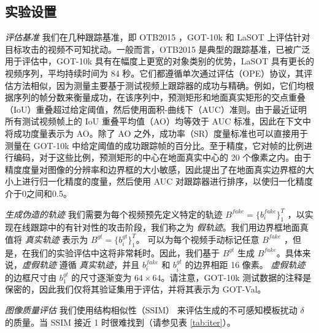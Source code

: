 \subsection{实验设置}

\textit{评估基准} 我们在几种跟踪基准，即 OTB2015 \cite{OTB}，GOT-10k \cite{GOT-10k} 和 LaSOT \cite{LaSOT} 上评估针对目标攻击的视频不可知扰动。一般而言，OTB2015 是典型的跟踪基准，已被广泛用于评估中，GOT-10k 具有在幅度上更宽的对象类别的优势，LaSOT 具有更长的视频序列，平均持续时间为 84 秒。它们都遵循单次通过评估（OPE）协议，其评估方法相似，因为测量主要基于测试视频上跟踪器的成功与精确。例如，它们均根据序列的帧分数来衡量成功，在该序列中，预测矩形和地面真实矩形的交点重叠（IoU）重叠超过给定阈值，然后使用面积-曲线下（AUC）准则。由于最近证明所有测试视频帧上的 IoU 重叠平均值（AO）均等效于 AUC 标准，因此在下文中将成功度量表示为 AO。除了 AO 之外，成功率（SR）度量标准也可以直接用于测量在 GOT-10k 中给定阈值的成功跟踪帧的百分比。至于精度，它对帧的比例进行编码，对于这些比例，预测矩形的中心在地面真实中心的 20 个像素之内。由于精度度量对图像的分辨率和边界框的大小敏感，因此提出了在地面真实边界框的大小上进行归一化精度的度量，然后使用 AUC 对跟踪器进行排序，以使归一化精度介于0之间和0.5。

\textit{生成伪造的轨迹} 我们需要为每个视频预先定义特定的轨迹 $B^{fake}=\{b^{fake}_i\}_1^{T}$ ，以实现在线跟踪中的有针对性的攻击阶段，我们称之为 \textit{假轨迹}。我们用边界框地面真值将 \textit{真实轨迹} 表示为 $B^{gt}=\{b^{gt}_i\}_1^T$。
可以为每个视频手动标记任意 $B^{fake}$ ，但是，在我们的实验评估中这将非常耗时。因此，我们基于 $B^{gt}$ 生成 $B^{fake}$。具体来说，\textit{虚假轨迹} 遵循 \textit{真实轨迹}，并且 $b^{fake}_i$ 和 $b^{gt}_i$ 的边界相距 16 像素。
\textit{虚假轨迹} 的边框尺寸由 $b^{gt}_1$ 的尺寸逐渐变为 $64\times 64$。请注意，GOT-10k 测试数据的注释是保密的，因此我们仅将其验证集用于评估，并将其表示为 GOT-Val。

\textit{图像质量评估} 我们使用结构相似性（SSIM）\cite{SSIM} 来评估生成的不可感知模板扰动 $\delta$ 的质量。当 SSIM 接近 1 时很难找到（请参见表 \ref{tab:iter}）。

